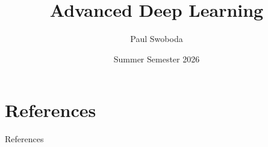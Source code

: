 \documentclass[8pt]{beamer}
\title{Advanced Deep Learning}
\author{Paul Swoboda}
\institute{HHU D\"usseldorf}
\date{Summer Semester 2026}
\begin{document}
\frame{\titlepage}















%
%
%
%
%

\section{References}
\begin{frame}[allowframebreaks]{References}
  \printbibliography[heading=none]
\end{frame}
\end{document}
